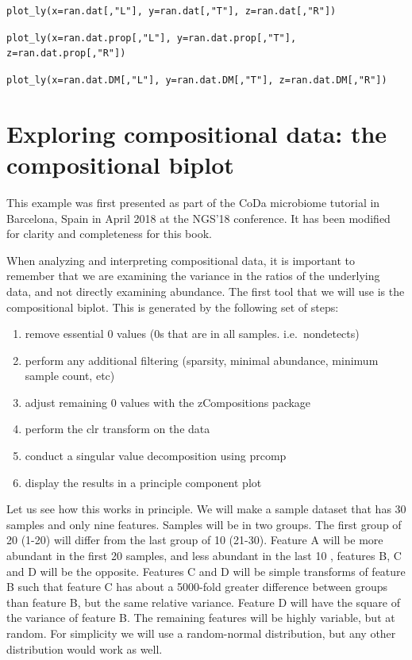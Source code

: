 \documentclass[onecolumn]{book}
\providecommand{\tightlist}{%
  \setlength{\itemsep}{0pt}\setlength{\parskip}{0pt}}
\theoremstyle{definition}
\theoremstyle{definition}
\theoremstyle{definition}
\theoremstyle{remark}
\begin{document}
\texttt{plot\_ly(x=ran.dat[,"L"], y=ran.dat[,"T"], z=ran.dat[,"R"])}

\texttt{plot\_ly(x=ran.dat.prop[,"L"], y=ran.dat.prop[,"T"], z=ran.dat.prop[,"R"])}

\texttt{plot\_ly(x=ran.dat.DM[,"L"], y=ran.dat.DM[,"T"], z=ran.dat.DM[,"R"])}

\hypertarget{biplot}{%
\chapter{Exploring compositional data: the compositional
biplot}\label{biplot}}

\hspace{2cm}\begin{minipage}[ct]{10cm}
\parskip=5pt
\parindent=5pt
This example was first presented as part of the CoDa microbiome tutorial in Barcelona, Spain in April 2018 at the NGS'18 conference.  It has been modified for clarity and completeness for this book.
\end{minipage}
\vspace{1cm}

When analyzing and interpreting compositional data, it is important to
remember that we are examining the variance in the ratios of the
underlying data, and not directly examining abundance. The first tool
that we will use is the compositional biplot. This is generated by the
following set of steps:

\begin{enumerate}
\def\labelenumi{\arabic{enumi}.}
\tightlist
\item
  remove essential 0 values (0s that are in all samples.
  i.e.~nondetects)
\item
  perform any additional filtering (sparsity, minimal abundance, minimum
  sample count, etc)
\item
  adjust remaining 0 values with the zCompositions package
\item
  perform the clr transform on the data
\item
  conduct a singular value decomposition using prcomp
\item
  display the results in a principle component plot
\end{enumerate}

Let us see how this works in principle. We will make a sample dataset
that has 30 samples and only nine features. Samples will be in two
groups. The first group of 20 (1-20) will differ from the last group of
10 (21-30). Feature A will be more abundant in the first 20 samples, and
less abundant in the last 10 , features B, C and D will be the opposite.
Features C and D will be simple transforms of feature B such that
feature C has about a 5000-fold greater difference between groups than
feature B, but the same relative variance. Feature D will have the
square of the variance of feature B. The remaining features will be
highly variable, but at random. For simplicity we will use a
random-normal distribution, but any other distribution would work as
well.
\end{document}
